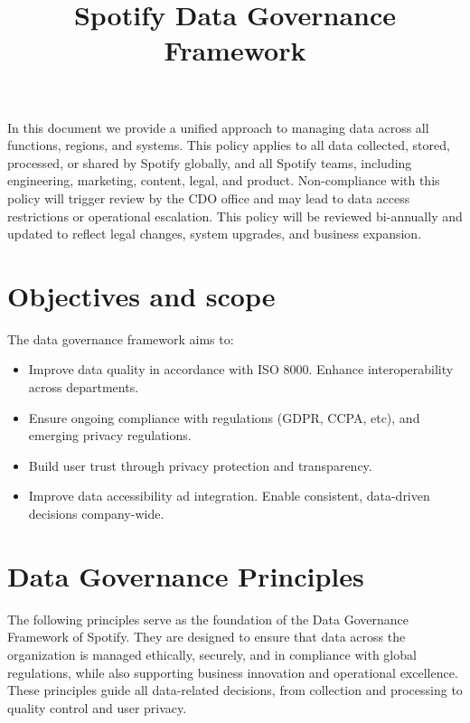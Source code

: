 \documentclass[11pt,a4paper,computermodern]{article}
\title{Spotify Data Governance Framework}
\date{}
\begin{document}
\maketitle

\vspace{-10mm}


In this document we provide a unified approach to managing data across all functions, regions, and systems. This policy applies to all data collected, stored, processed, or shared by Spotify globally, and all Spotify teams, including engineering, marketing, content, legal, and product. Non-compliance with this policy will trigger review by the CDO office and may lead to data access restrictions or operational escalation. This policy will be reviewed bi-annually and updated to reflect legal changes, system upgrades, and business expansion.

\section*{Objectives and scope}

The data governance framework aims to:
\begin{itemize}[itemsep=5pt, parsep=0pt]
	\item Improve data quality in accordance with ISO 8000. Enhance interoperability across departments.
	\item Ensure ongoing compliance with regulations (GDPR, CCPA, etc), and emerging privacy regulations.
	\item Build user trust through privacy protection and transparency.
	\item Improve data accessibility ad integration. Enable consistent, data-driven decisions company-wide.
\end{itemize}


\section*{Data Governance Principles}

The following principles serve as the foundation of the Data Governance Framework of Spotify. They are designed to ensure that data across the organization is managed ethically, securely, and in compliance with global regulations, while also supporting business innovation and operational excellence. These principles guide all data-related decisions, from collection and processing to quality control and user privacy.
\end{document}
